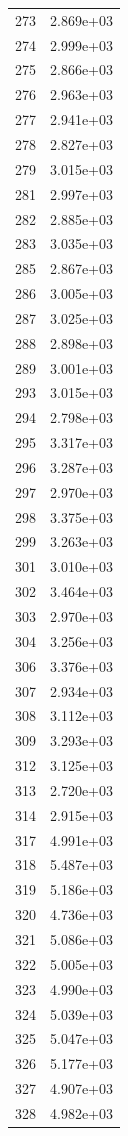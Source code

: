 \documentclass[12pt]{article}
\begin{document}
\begin{longtable}{@{}cc@{}}
273 & 2.869e+03 \\
274 & 2.999e+03 \\
275 & 2.866e+03 \\
276 & 2.963e+03 \\
277 & 2.941e+03 \\
278 & 2.827e+03 \\
279 & 3.015e+03 \\
281 & 2.997e+03 \\
282 & 2.885e+03 \\
283 & 3.035e+03 \\
285 & 2.867e+03 \\
286 & 3.005e+03 \\
287 & 3.025e+03 \\
288 & 2.898e+03 \\
289 & 3.001e+03 \\
293 & 3.015e+03 \\
294 & 2.798e+03 \\
295 & 3.317e+03 \\
296 & 3.287e+03 \\
297 & 2.970e+03 \\
298 & 3.375e+03 \\
299 & 3.263e+03 \\
301 & 3.010e+03 \\
302 & 3.464e+03 \\
303 & 2.970e+03 \\
304 & 3.256e+03 \\
306 & 3.376e+03 \\
307 & 2.934e+03 \\
308 & 3.112e+03 \\
309 & 3.293e+03 \\
312 & 3.125e+03 \\
313 & 2.720e+03 \\
314 & 2.915e+03 \\
317 & 4.991e+03 \\
318 & 5.487e+03 \\
319 & 5.186e+03 \\
320 & 4.736e+03 \\
321 & 5.086e+03 \\
322 & 5.005e+03 \\
323 & 4.990e+03 \\
324 & 5.039e+03 \\
325 & 5.047e+03 \\
326 & 5.177e+03 \\
327 & 4.907e+03 \\
328 & 4.982e+03 \\

\end{longtable}
\end{document}
